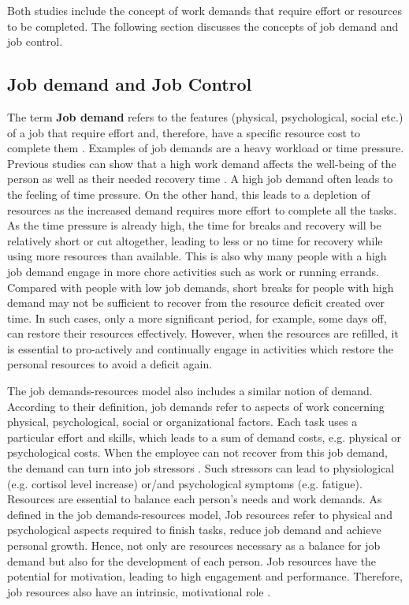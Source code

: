 \documentclass{hasel_thesis}
\begin{document}
Both studies include the concept of work demands that require effort or resources to be completed. The following section discusses the concepts of job demand and job control.



\subsection{Job demand and Job Control} \label{job_control}
The term \textbf{Job demand} refers to the features (physical, psychological, social etc.) of a job that require effort and, therefore, have a specific resource cost to complete them \cite{Trougakos.2009}. Examples of job demands are a heavy workload or time pressure. Previous studies can show that a high work demand affects the well-being \cite{Sonnentag.2003} of the person as well as their needed recovery time \cite{Sonnentag.2006}. A high job demand often leads to the feeling of time pressure. On the other hand, this leads to a depletion of resources as the increased demand requires more effort to complete all the tasks. As the time pressure is already high, the time for breaks and recovery will be relatively short or cut altogether, leading to less or no time for recovery while using more resources than available. This is also why many people with a high job demand engage in more chore activities such as work or running errands.
Compared with people with low job demands, short breaks for people with high demand may not be sufficient to recover from the resource deficit created over time. In such cases, only a more significant period, for example, some days off, can restore their resources effectively. However, when the resources are refilled, it is essential to pro-actively and continually engage in activities which restore the personal resources to avoid a deficit again.

The job demands-resources model \cite{BakkerA.B.DemeroutiE.DeBoerE.andSchaufeliW.B..2003b, DemeroutiE.BakkerA.B.NachreinerF.andSchaufeliW.B..2001a} also includes a similar notion of demand. According to their definition, job demands refer to aspects of work concerning physical, psychological, social or organizational factors. Each task uses a particular effort and skills, which leads to a sum of demand costs, e.g. physical or psychological costs. When the employee can not recover from this job demand, the demand can turn into job stressors \cite{Hobfoll.1998}. Such stressors can lead to physiological (e.g. cortisol level increase) or/and psychological symptoms (e.g. fatigue)\cite{Sonnentag.2022}. Resources are essential to balance each person's needs and work demands. As defined in the job demands-resources model, Job resources refer to physical and psychological aspects required to finish tasks, reduce job demand and achieve personal growth. Hence, not only are resources necessary as a balance for job demand but also for the development of each person. Job resources have the potential for motivation, leading to high engagement and performance. Therefore, job resources also have an intrinsic, motivational role \cite{Bakker.2007}.
\end{document}
